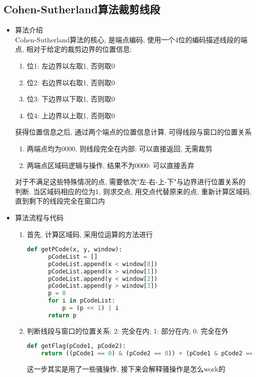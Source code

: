 \documentclass[a4paper,UTF8]{article}
\theoremstyle{definition}
\begin{document}
\subsection{Cohen-Sutherland算法裁剪线段}
\begin{itemize}
  \item 算法介绍\\
  Cohen-Sutherland算法\cite{rog_2002}的核心, 是端点编码, 使用一个4位的编码描述线段的端点, 相对于给定的裁剪边界的位置信息:\begin{enumerate}
    \item 位1: 左边界以左取1, 否则取0
    \item 位2: 右边界以右取1, 否则取0
    \item 位3: 下边界以下取1, 否则取0
    \item 位4: 上边界以上取1, 否则取0
  \end{enumerate}
  获得位置信息之后, 通过两个端点的位置信息计算, 可得线段与窗口的位置关系\begin{enumerate}
    \item 两端点均为0000, 则线段完全在内部: 可以直接返回, 无需裁剪
    \item 两端点区域码逻辑与操作, 结果不为0000: 可以直接丢弃
  \end{enumerate}
  对于不满足这些特殊情况的点, 需要依次"左-右-上-下"与边界进行位置关系的判断. 当区域码相应的位为1, 则求交点, 用交点代替原来的点, 重新计算区域码, 直到剩下的线段完全在窗口内\\
  \item 算法流程与代码\begin{enumerate}
    \item 首先, 计算区域码, 采用位运算的方法进行
    \begin{lstlisting}[language={Python}] 
  def getPCode(x, y, window):
      pCodeList = []
      pCodeList.append(x < window[0])
      pCodeList.append(x > window[1])
      pCodeList.append(y < window[2])
      pCodeList.append(y > window[3])
      p = 0
      for i in pCodeList:
          p = (p << 1) | i
      return p\end{lstlisting}
    \item 判断线段与窗口的位置关系: 2: 完全在内; 1: 部分在内; 0: 完全在外\\
    \begin{lstlisting}[language={Python}] 
      def getFlag(pCode1, pCode2):
    return ((pCode1 == 0) & (pCode2 == 0)) + (pCode1 & pCode2 == 0)\end{lstlisting}
    这一步其实是用了一些骚操作, 接下来会解释骚操作是怎么work的\begin{itemize}

\end{itemize}
\end{enumerate}
\end{itemize}
\end{document}
